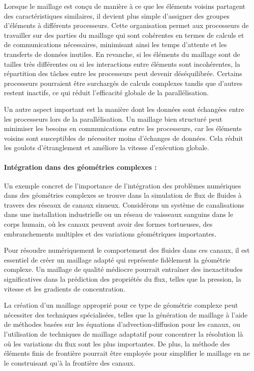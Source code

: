 Lorsque le maillage est conçu de manière à ce que les éléments voisins partagent des caractéristiques similaires, il devient plus simple d'assigner des groupes d'éléments à différents processeurs. Cette organisation permet aux processeurs de travailler sur des parties du maillage qui sont cohérentes en termes de calculs et de communications nécessaires, minimisant ainsi les temps d'attente et les transferts de données inutiles. En revanche, si les éléments du maillage sont de tailles très différentes ou si les interactions entre éléments sont incohérentes, la répartition des tâches entre les processeurs peut devenir déséquilibrée. Certains processeurs pourraient être surchargés de calculs complexes tandis que d'autres restent inactifs, ce qui réduit l'efficacité globale de la parallélisation.

Un autre aspect important est la manière dont les données sont échangées entre les processeurs lors de la parallélisation. Un maillage bien structuré peut minimiser les besoins en communications entre les processeurs, car les éléments voisins sont susceptibles de nécessiter moins d'échanges de données. Cela réduit les goulots d'étranglement et améliore la vitesse d'exécution globale.

\paragraph{Intégration dans des géométries complexes :}

Un exemple concret de l'importance de l'intégration des problèmes numériques dans des géométries complexes se trouve dans la simulation de flux de fluides à travers des réseaux de canaux sinueux. Considérons un système de canalisations dans une installation industrielle ou un réseau de vaisseaux sanguins dans le corps humain, où les canaux peuvent avoir des formes tortueuses, des embranchements multiples et des variations géométriques importantes.

Pour résoudre numériquement le comportement des fluides dans ces canaux, il est essentiel de créer un maillage adapté qui représente fidèlement la géométrie complexe. Un maillage de qualité médiocre pourrait entraîner des inexactitudes significatives dans la prédiction des propriétés du flux, telles que la pression, la vitesse et les gradients de concentration.

La création d'un maillage approprié pour ce type de géométrie complexe peut nécessiter des techniques spécialisées, telles que la génération de maillage à l'aide de méthodes basées sur les équations d'advection-diffusion pour les canaux, ou l'utilisation de techniques de maillage adaptatif pour concentrer la résolution là où les variations du flux sont les plus importantes. De plus, la méthode des éléments finis de frontière pourrait être employée pour simplifier le maillage en ne le construisant qu'à la frontière des canaux.\\

